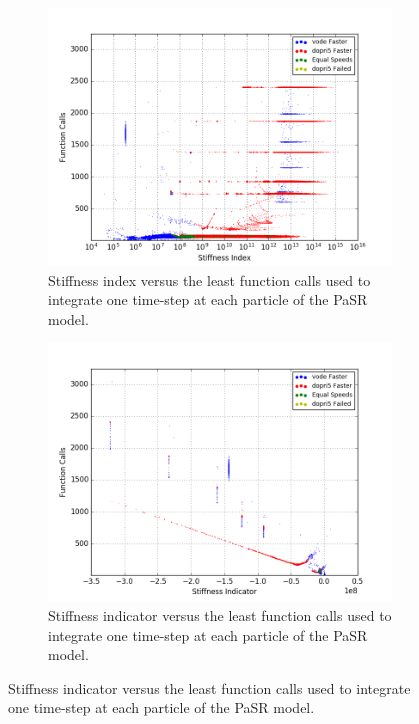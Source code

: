 \documentclass[12pt]{ussci}
\begin{document}
\begin{figure}[htbp]
\begin{subfigure}{0.43\textwidth}
        \label{fig:SRH2COPaSR}
    \end{subfigure}
    \begin{subfigure}{0.43\textwidth}
        \includegraphics[width=\linewidth]{PaSR_Fn_Work_Index_Groupings_1e-06.png}
        \caption{Stiffness index versus the least function calls used to integrate one time-step at each particle of the PaSR model.}
        \label{fig:SI1H2COPaSR}
    \end{subfigure}
    \hfill
    \begin{subfigure}{0.43\textwidth}
        \includegraphics[width=\linewidth]{PaSR_Fn_Work_Indicator_Groupings_1e-06.png}
        \caption{Stiffness indicator versus the least function calls used to integrate one time-step at each particle of the PaSR model.}

\end{subfigure}
\end{figure}
\end{document}
